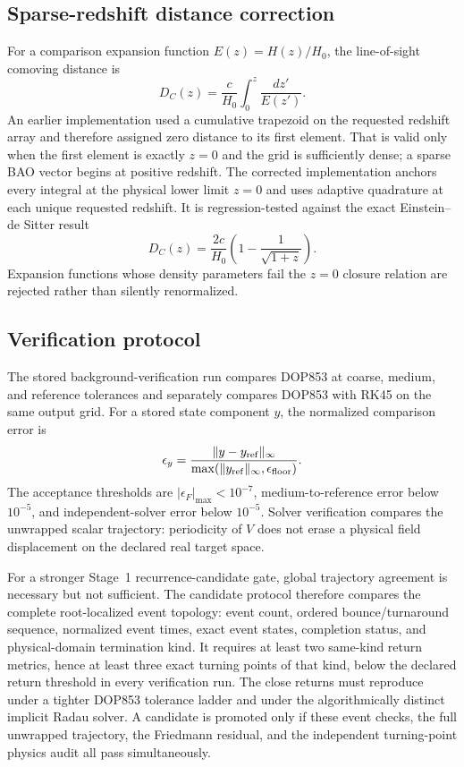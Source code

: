 \subsection{Sparse-redshift distance correction}
For a comparison expansion function $E(z)=H(z)/H_0$, the line-of-sight comoving distance is
\begin{equation}
D_C(z)=\frac{c}{H_0}\int_0^z\frac{dz'}{E(z')}.
\end{equation}
An earlier implementation used a cumulative trapezoid on the requested redshift array and therefore assigned zero distance to its first element. That is valid only when the first element is exactly $z=0$ and the grid is sufficiently dense; a sparse BAO vector begins at positive redshift. The corrected implementation anchors every integral at the physical lower limit $z=0$ and uses adaptive quadrature at each unique requested redshift. It is regression-tested against the exact Einstein--de Sitter result
\begin{equation}
D_C(z)=\frac{2c}{H_0}\left(1-\frac{1}{\sqrt{1+z}}\right).
\end{equation}
Expansion functions whose density parameters fail the $z=0$ closure relation are rejected rather than silently renormalized.

\subsection{Verification protocol}
The stored background-verification run compares DOP853 at coarse, medium, and reference tolerances and separately compares DOP853 with RK45 on the same output grid. For a stored state component $y$, the normalized comparison error is
\begin{equation}
\epsilon_y=\frac{\lVert y-y_{\rm ref}\rVert_\infty}{\max(\lVert y_{\rm ref}\rVert_\infty,\epsilon_{\rm floor})}.
\end{equation}
The acceptance thresholds are $|\epsilon_F|_{\max}<10^{-7}$, medium-to-reference error below $10^{-5}$, and independent-solver error below $10^{-5}$. Solver verification compares the unwrapped scalar trajectory: periodicity of $V$ does not erase a physical field displacement on the declared real target space.

For a stronger Stage~1 recurrence-candidate gate, global trajectory agreement is necessary but not sufficient. The candidate protocol therefore compares the complete root-localized event topology: event count, ordered bounce/turnaround sequence, normalized event times, exact event states, completion status, and physical-domain termination kind. It requires at least two same-kind return metrics, hence at least three exact turning points of that kind, below the declared return threshold in every verification run. The close returns must reproduce under a tighter DOP853 tolerance ladder and under the algorithmically distinct implicit Radau solver. A candidate is promoted only if these event checks, the full unwrapped trajectory, the Friedmann residual, and the independent turning-point physics audit all pass simultaneously.

